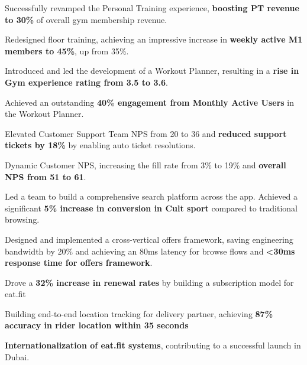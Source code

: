 \begin{cventries2}
{\begin{cvitems}
        \item {Successfully revamped the Personal Training experience, \textbf{boosting PT revenue to 30\%} of overall gym membership revenue.}
        \item {Redesigned floor training, achieving an impressive increase in \textbf{weekly active M1 members to 45\%}, up from 35\%.}
        \item {Introduced and led the development of a Workout Planner, resulting in a \textbf{rise in Gym experience rating from 3.5 to 3.6}.}
        \item {Achieved an outstanding \textbf{40\% engagement from Monthly Active Users} in the Workout Planner.}
        \item {Elevated Customer Support Team NPS from 20 to 36 and \textbf{reduced support tickets by 18\%} by enabling auto ticket resolutions.}
        \item {Dynamic Customer NPS, increasing the fill rate from 3\% to 19\% and \textbf{overall NPS from 51 to 61}.}
        \item {Led a team to build a comprehensive search platform across the app. Achieved a significant \textbf{5\% increase in conversion in Cult sport} compared to traditional browsing.}
        \item {Designed and implemented a cross-vertical offers framework, saving engineering bandwidth by 20\% and achieving an 80ms latency for browse flows and \textbf{<30ms response time for offers framework}.}
        \item {Drove a \textbf{32\% increase in renewal rates} by building a subscription model for eat.fit}
        \item {Building end-to-end location tracking for delivery partner, achieving \textbf{87\% accuracy in rider location within 35 seconds}}
        \item {\textbf{Internationalization of eat.fit systems}, contributing to a successful launch in Dubai.}
      \end{cvitems}
    }




\end{cventries2}
